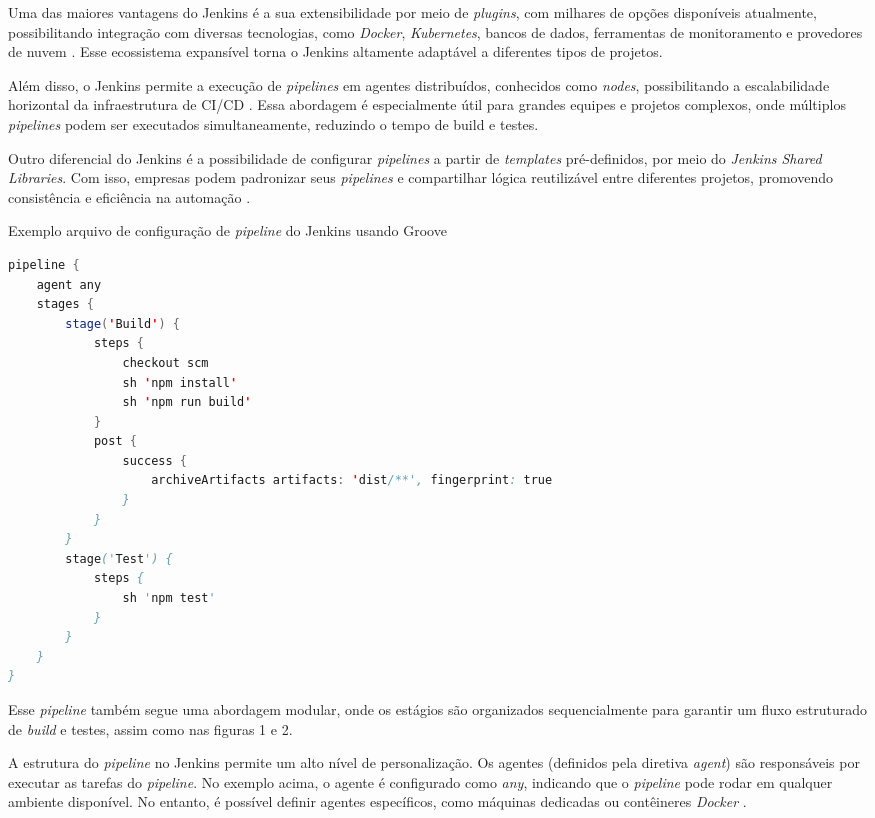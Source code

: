 Uma das maiores vantagens do Jenkins é a sua extensibilidade por meio de \textit{plugins}, com milhares de opções disponíveis atualmente, possibilitando integração com diversas tecnologias, como \textit{Docker}, \textit{Kubernetes}, bancos de dados, ferramentas de monitoramento e provedores de nuvem \cite{JenkinsPlugins}. Esse ecossistema expansível torna o Jenkins altamente adaptável a diferentes tipos de projetos.

Além disso, o Jenkins permite a execução de \textit{pipelines} em agentes distribuídos, conhecidos como \textit{nodes}, possibilitando a escalabilidade horizontal da infraestrutura de CI/CD \cite{JenkinsAgents}. Essa abordagem é especialmente útil para grandes equipes e projetos complexos, onde múltiplos \textit{pipelines} podem ser executados simultaneamente, reduzindo o tempo de build e testes.

Outro diferencial do Jenkins é a possibilidade de configurar \textit{pipelines} a partir de \textit{templates} pré-definidos, por meio do \textit{Jenkins Shared Libraries}. Com isso, empresas podem padronizar seus \textit{pipelines} e compartilhar lógica reutilizável entre diferentes projetos, promovendo consistência e eficiência na automação \cite{JenkinsSharedLibraries}.

\begin{sourcecode}[H]
\caption{\label{codigo:codigoJenkins}Exemplo arquivo de configuração de \textit{pipeline} do Jenkins usando Groove}
\begin{lstlisting}[frame=single, language=Java]
pipeline {
    agent any 
    stages {
        stage('Build') {
            steps {
                checkout scm 
                sh 'npm install'
                sh 'npm run build'
            }
            post {
                success {
                    archiveArtifacts artifacts: 'dist/**', fingerprint: true
                }
            }
        }
        stage('Test') {
            steps {
                sh 'npm test'
            }
        }
    }
}
\end{lstlisting}
\fonte{}
\end{sourcecode}

Esse \textit{pipeline} também segue uma abordagem modular, onde os estágios são organizados sequencialmente para garantir um fluxo estruturado de \textit{build} e testes, assim como nas figuras 1 e 2.

A estrutura do \textit{pipeline} no Jenkins permite um alto nível de personalização. Os agentes (definidos pela diretiva \textit{agent}) são responsáveis por executar as tarefas do \textit{pipeline}. No exemplo acima, o agente é configurado como \textit{any}, indicando que o \textit{pipeline} pode rodar em qualquer ambiente disponível. No entanto, é possível definir agentes específicos, como máquinas dedicadas ou contêineres \textit{Docker} \cite{JenkinsAgents}.

